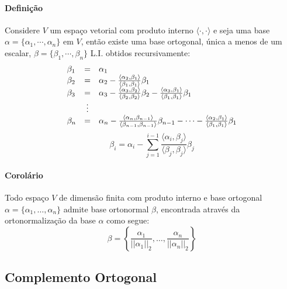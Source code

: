 \documentclass{article}
\begin{document}
            \paragraph{Definição}Considere $V$ um espaço vetorial com produto interno $\langle\cdot,\cdot\rangle$ e seja uma base $\alpha = \{\alpha_{1}, \cdots, \alpha_{n}\}$ em $V$, então existe uma base ortogonal, única a menos de um escalar, $\beta = \{\beta_{1}, \cdots, \beta_{n}\}$ L.I. obtidos recursivamente:
                \[\begin{array}{l c l}
                    \beta_{1} & = & \alpha_{1}\\
                    \beta_{2} & = & \alpha_{2} - \frac{\langle \alpha_{2}, \beta_{1} \rangle}{\langle \beta_{1}, \beta_{1} \rangle}\beta_{1}\\
                    \beta_{3} & = & \alpha_{3} - \frac{\langle \alpha_{3}, \beta_{2} \rangle}{\langle \beta_{2}, \beta_{2} \rangle}\beta_{2}
                                               - \frac{\langle \alpha_{3}, \beta_{1} \rangle}{\langle \beta_{1}, \beta_{1} \rangle}\beta_{1}\\
                              & \vdots & \\
                    \beta_{n} & = & \alpha_{n} - \frac{\langle \alpha_{n}, \beta_{n-1} \rangle}{\langle \beta_{n-1}, \beta_{n-1} \rangle}\beta_{n-1}
                                               - \cdots
                                               - \frac{\langle \alpha_{2}, \beta_{1} \rangle}{\langle \beta_{1}, \beta_{1} \rangle}\beta_{1}\\
                \end{array}\vspace{5mm}\]
                \[\boxed{\beta_{i} = \alpha_{i} - \sum\limits_{j = 1}^{i-1} \frac{\langle \alpha_{i}, \beta_{j} \rangle}{\langle \beta_{j}, \beta_{j} \rangle}\beta_{j}}\]

            \paragraph{Corolário}Todo espaço $V$ de dimensão finita com produto interno e base ortogonal $\alpha = \{\alpha_{1}, \dots, \alpha_{n}\}$ admite base ortonormal $\beta$, encontrada através da ortonormalização da base $\alpha$ como segue:
                \[\boxed{\beta = \left\{\frac{\alpha_{1}}{||\alpha_{1}||_{2}}, \dots, \frac{\alpha_{n}}{||\alpha_{n}||_{2}}\right\}}\]

        \subsection{Complemento Ortogonal}
\end{document}
